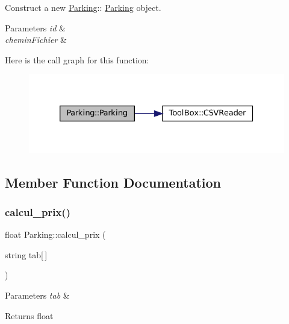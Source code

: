 Construct a new \mbox{\hyperlink{class_parking}{Parking}}\+:\+: \mbox{\hyperlink{class_parking}{Parking}} object. 


\begin{DoxyParams}{Parameters}
{\em id} & \\
\hline
{\em chemin\+Fichier} & \\
\hline
\end{DoxyParams}
Here is the call graph for this function\+:
\nopagebreak
\begin{figure}[H]
\begin{center}
\leavevmode
\includegraphics[width=326pt]{class_parking_a300004ddbc70c562488cf3f933d5cfb3_cgraph}
\end{center}
\end{figure}


\subsection{Member Function Documentation}
\mbox{\label{class_parking_a41df7b6f534723a56c36f7c06d336f1b}} 
\subsubsection{\texorpdfstring{calcul\+\_\+prix()}{calcul\_prix()}}
{\footnotesize\ttfamily float Parking\+::calcul\+\_\+prix (\begin{DoxyParamCaption}\item[{string}]{tab\mbox{[}$\,$\mbox{]} }\end{DoxyParamCaption})}


\begin{DoxyParams}{Parameters}
{\em tab} & \\
\hline
\end{DoxyParams}
\begin{DoxyReturn}{Returns}
float 
\end{DoxyReturn}
\mbox{\label{class_parking_a28bcb84c5a6f26d13646253fd69471dd}} 

